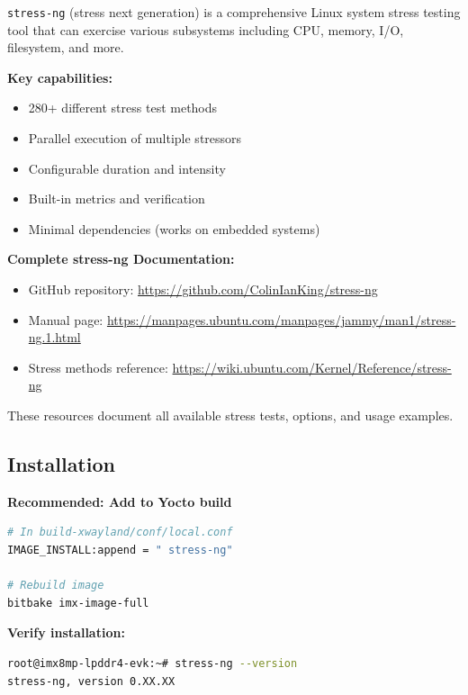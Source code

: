 \documentclass[12pt,a4paper]{report}
\begin{document}
\texttt{stress-ng} (stress next generation) is a comprehensive Linux system stress testing tool that can exercise various subsystems including CPU, memory, I/O, filesystem, and more.

\textbf{Key capabilities:}
\begin{itemize}
    \item 280+ different stress test methods
    \item Parallel execution of multiple stressors
    \item Configurable duration and intensity
    \item Built-in metrics and verification
    \item Minimal dependencies (works on embedded systems)
\end{itemize}

\begin{docref}
\textbf{Complete stress-ng Documentation:}

\begin{itemize}
    \item GitHub repository: \url{https://github.com/ColinIanKing/stress-ng}
    \item Manual page: \url{https://manpages.ubuntu.com/manpages/jammy/man1/stress-ng.1.html}
    \item Stress methods reference: \url{https://wiki.ubuntu.com/Kernel/Reference/stress-ng}
\end{itemize}

These resources document all available stress tests, options, and usage examples.
\end{docref}

\subsection{Installation}

\textbf{Recommended: Add to Yocto build}

\begin{lstlisting}[language=bash]
# In build-xwayland/conf/local.conf
IMAGE_INSTALL:append = " stress-ng"

# Rebuild image
bitbake imx-image-full
\end{lstlisting}

\textbf{Verify installation:}
\begin{lstlisting}[language=bash]
root@imx8mp-lpddr4-evk:~# stress-ng --version
stress-ng, version 0.XX.XX
\end{lstlisting}
\end{document}

